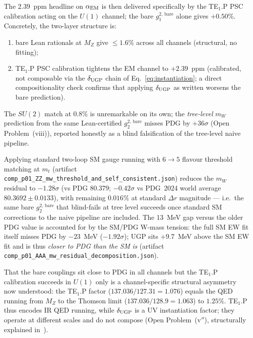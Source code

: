 \documentclass[11pt]{article}
\theoremstyle{remark}
\begin{document}
\smallskip
The $2.39$~ppm headline on $\alpha_{\rm EM}$ is then delivered specifically by the TE$_1$.P PSC calibration acting on the $U(1)$ channel; the bare $g_1^{2,\,\mathrm{bare}}$ alone gives $+0.50\%$.  Concretely, the two-layer structure is:
\begin{enumerate}[leftmargin=1.6em,itemsep=0.15em,topsep=0.2em]
  \item bare Lean rationals at $M_Z$ give $\le 1.6\%$ across all channels (structural, no fitting);
  \item TE$_1$.P PSC calibration tightens the EM channel to $+2.39$~ppm (calibrated, not composable via the $\delta_{\rm UGP}$ chain of Eq.~\eqref{eq:instantiation}; a direct compositionality check confirms that applying $\delta_{\rm UGP}$ as written worsens the bare prediction).
\end{enumerate}

\smallskip
The $SU(2)$ match at $0.8\%$ is unremarkable on its own; the \emph{tree-level} $m_W$ prediction from the same Lean-certified $g_2^{2,\,\mathrm{bare}}$ misses PDG by $+36\sigma$ (Open Problem~(viii)), reported honestly as a blind falsification of the tree-level naive pipeline.

\smallskip
Applying standard two-loop SM gauge running with $6{\to}5$ flavour threshold matching at $m_t$ (artifact \texttt{comp\_p01\_ZZ\_mw\_threshold\_\allowbreak and\_self\_consistent.json}) reduces the $m_W$ residual to $-1.28\sigma$ (vs PDG 80.379; $-0.42\sigma$ vs PDG~2024 world average $80.3692 \pm 0.0133$), with remaining $0.016\%$ at standard $\Delta r$ magnitude --- i.e.\ the same bare $g_2^{2,\,\mathrm{bare}}$ that blind-fails at tree level succeeds once standard SM corrections to the naive pipeline are included.  The 13~MeV gap versus the older PDG value is accounted for by the SM/PDG W-mass tension: the full SM EW fit itself misses PDG by $-23$~MeV ($-1.92\sigma$); UGP sits $+9.7$~MeV above the SM EW fit and is thus \emph{closer to PDG than the SM is} (artifact \texttt{comp\_p01\_AAA\_mw\_residual\_\allowbreak decomposition.json}).

\smallskip
That the bare couplings sit close to PDG in all channels but the TE$_1$.P calibration succeeds in $U(1)$ only is a channel-specific structural asymmetry now understood: the TE$_1$.P factor ($137.036/127.31 = 1.076$) equals the QED running from $M_Z$ to the Thomson limit ($137.036/128.9 = 1.063$) to $1.25\%$.
TE$_1$.P thus encodes IR QED running, while $\delta_{\rm UGP}$ is a UV instantiation factor; they operate at different scales and do not compose (Open Problem~(v$''$), structurally explained in~\cite{Spivack2026_Uniqueness25}).
\end{document}
